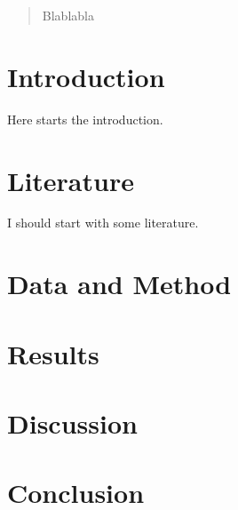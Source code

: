 \documentclass[
]{article}
\begin{document}
\begin{abstract}
Blablabla 
\end{abstract}
\newpage



{
\setcounter{tocdepth}{3}
\tableofcontents
}
\listoftables
\listoffigures
\newpage


\hypertarget{introduction}{%
\section{Introduction}\label{introduction}}

Here starts the introduction.

\newpage

\hypertarget{literature}{%
\section{Literature}\label{literature}}

I should start with some literature.

\newpage

\hypertarget{data-and-method}{%
\section{Data and Method}\label{data-and-method}}

\newpage

\hypertarget{results}{%
\section{Results}\label{results}}

\newpage

\hypertarget{discussion}{%
\section{Discussion}\label{discussion}}

\hypertarget{conclusion}{%
\section{Conclusion}\label{conclusion}}
\end{document}

